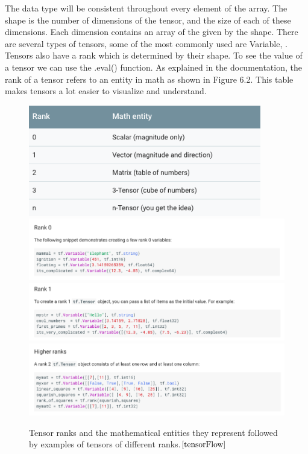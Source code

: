 \documentclass[12pt]{report} %
\begin{document}
	The data type will be consistent throughout every element of the array. The shape is the number of dimensions of the tensor, and the size of each of these dimensions. Each dimension contains an array of the given by the shape. There are several types of tensors, some of the most commonly used are Variable, . Tensors also have a rank which is determined by their shape. To see the value of a tensor we can use the .eval() function. As explained in the documentation, the rank of a tensor refers to an entity in math as shown in Figure 6.2. This table makes tensors a lot easier to visualize and understand\cite{tensorFlow}.
\begin{figure}
\centering
\includegraphics[width=4in]{tf_rank}
\includegraphics[width=7in]{rank0}
\includegraphics[width=7in]{rank2}
\includegraphics[width=7in]{rank1}
\caption{Tensor ranks and the mathematical entities they represent followed by examples of tensors of different ranks.$\cite{tensorFlow}$}
\end{figure}	
\end{document}
